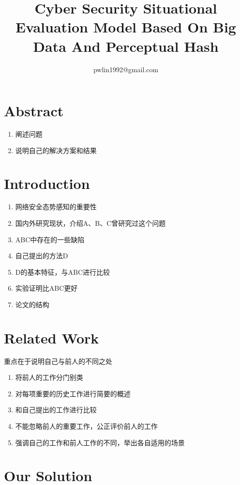 \documentclass{article}
\title{Cyber Security Situational Evaluation Model Based On Big Data And Perceptual Hash}
\author{pwlin1992@gmail.com}
\begin{document}
\maketitle
\tableofcontents
\begin{large}

\section{Abstract}

\begin{enumerate}
\item 阐述问题
\item 说明自己的解决方案和结果
\end{enumerate}
\section{Introduction}

\begin{enumerate}
\item 网络安全态势感知的重要性
\item 国内外研究现状，介绍A、B、C曾研究过这个问题
\item ABC中存在的一些缺陷
\item 自己提出的方法D
\item D的基本特征，与ABC进行比较
\item 实验证明比ABC更好
\item 论文的结构
\end{enumerate}

\section{Related Work}

重点在于说明自己与前人的不同之处
\begin{enumerate}
\item 将前人的工作分门别类
\item 对每项重要的历史工作进行简要的概述
\item 和自己提出的工作进行比较
\item 不能忽略前人的重要工作，公正评价前人的工作
\item 强调自己的工作和前人工作的不同，举出各自适用的场景
\end{enumerate}

\section{Our Solution}


\end{large}
\end{document}
